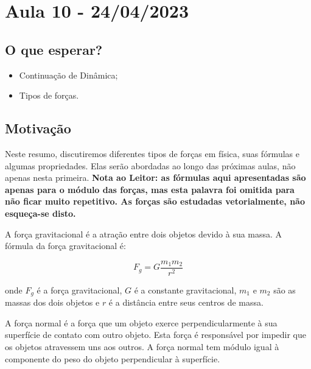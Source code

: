 \documentclass[PhysicsI/physics_notes.tex]{subfiles}
\begin{document}
\section{Aula 10 - 24/04/2023}
\subsection{O que esperar?}
\begin{itemize}
	\item Continuação de Dinâmica;
	\item Tipos de forças.
\end{itemize}
\subsection{Motivação}
Neste resumo, discutiremos diferentes tipos de forças em física, suas fórmulas e algumas propriedades. Elas serão abordadas ao longo
das próximas aulas, não apenas nesta primeira. \textbf{Nota ao Leitor: as fórmulas aqui apresentadas são apenas
	para o módulo das forças, mas esta palavra foi omitida para não ficar muito repetitivo. As forças são estudadas vetorialmente,
	não esqueça-se disto.}

A força gravitacional é a atração entre dois objetos devido à sua massa. A fórmula da força gravitacional é:

\begin{equation}
	F_g = G \frac{m_1 m_2}{r^2}
\end{equation}

onde $F_g$ é a força gravitacional, $G$ é a constante gravitacional, $m_1$ e $m_2$ são as massas dos dois objetos e $r$ é a distância entre seus centros de massa.
\begin{center}
\end{center}

A força normal é a força que um objeto exerce perpendicularmente à sua superfície de contato com outro objeto. Esta força é responsável por impedir que os objetos atravessem uns aos outros. A força normal tem módulo igual à componente do peso do objeto perpendicular à superfície.

\begin{center}
\end{center}
\end{document}
